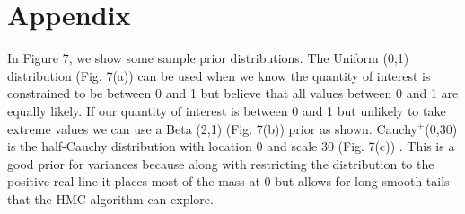 \documentclass{article}
\begin{document}
\section{Appendix}
%
%
In Figure 7, we show some sample prior distributions. The Uniform (0,1) distribution (Fig. 7(a)) can be used when we know the quantity of interest is constrained to be between 0 and 1 but believe that all values between 0 and 1 are equally likely. If our quantity of interest is between 0 and 1 but unlikely to take extreme values we can use a Beta (2,1) (Fig. 7(b))  prior as shown.  Cauchy$^{+}$(0,30) is the half-Cauchy distribution with location 0 and scale 30 (Fig. 7(c)) . This is a good prior for variances because along with restricting the distribution to the positive real line it places most of the mass at 0 but allows for long smooth tails that the HMC algorithm can explore. 
\iffalse
\end{document}
